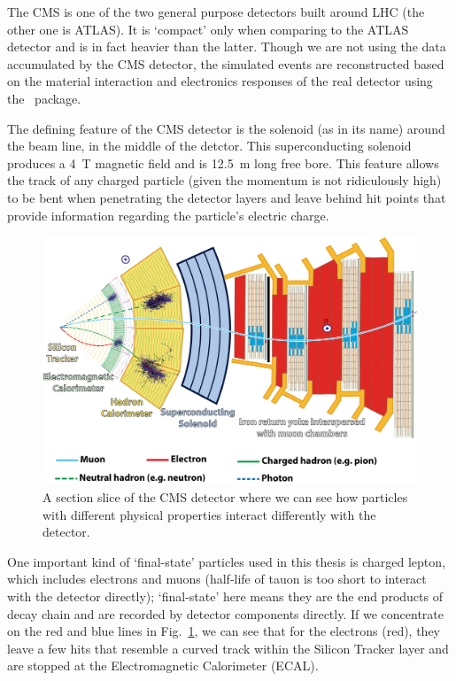 The CMS is one of the two general purpose detectors built around LHC (the other one is ATLAS). It
is `compact' only when comparing to the ATLAS detector and is in fact heavier than the latter.
Though we are not using the data accumulated by the CMS detector, the simulated events are
reconstructed based on the material interaction and electronics responses of the real detector using the
\gf~package\cite{geant4}.

The defining feature of the CMS detector is the solenoid (as in its name) around the beam line, in the
middle of the detctor.
This superconducting solenoid produces a \SI{4}{\tesla} magnetic field and is 
\SI{12.5}{\meter} long free bore\cite{solenoid_map}. This feature allows the track of
any charged particle (given the momentum is not ridiculously high) to be bent when penetrating
the detector layers and leave behind hit points that provide information regarding the particle's 
electric charge.


\begin{figure}[htb]
\begin{center}
\includegraphics[width=.75\linewidth]{fig/CMS_Slice.png}
\end{center}
\caption{A section slice of the CMS detector where we can see how 
particles with different physical properties interact differently with the detector.}
\label{fig:CMS_Slice}
\end{figure}

One important kind of `final-state' particles used in this thesis is charged lepton, 
which includes electrons and muons (half-life of tauon is too short to interact with
the detector directly);
`final-state' here means they are the end products of decay chain and are recorded by detector
components directly. If we concentrate on the red and blue lines in Fig.~\ref{fig:CMS_Slice}, we
can see that for the electrons (red), they leave a few hits that resemble a curved
track within the Silicon Tracker layer and are stopped at the Electromagnetic Calorimeter
(ECAL). 

